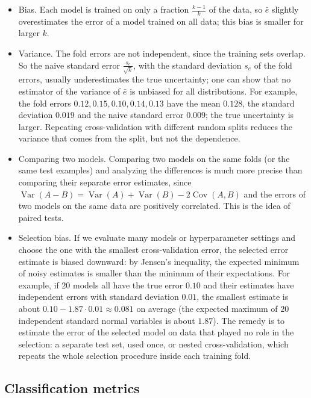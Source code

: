 \documentclass[11pt]{article}
\DeclareMathOperator{\Var}{Var}
\DeclareMathOperator{\Cov}{Cov}
\theoremstyle{definition}
\theoremstyle{plain}
\theoremstyle{remark}
\begin{document}
\begin{itemize}
    \item Bias. Each model is trained on only a fraction $\frac{k - 1}{k}$ of the data, so $\bar e$ slightly overestimates the error of a model trained on all data; this bias is smaller for larger $k$.
    \item Variance. The fold errors are not independent, since the training sets overlap. So the naive standard error $\frac{s_e}{\sqrt{k}}$, with the standard deviation $s_e$ of the fold errors, usually underestimates the true uncertainty; one can show that no estimator of the variance of $\bar e$ is unbiased for all distributions. For example, the fold errors $0.12, 0.15, 0.10, 0.14, 0.13$ have the mean $0.128$, the standard deviation $0.019$ and the naive standard error $0.009$; the true uncertainty is larger. Repeating cross-validation with different random splits reduces the variance that comes from the split, but not the dependence.
    \item Comparing two models. Comparing two models on the same folds (or the same test examples) and analyzing the differences is much more precise than comparing their separate error estimates, since $\Var(A - B) = \Var(A) + \Var(B) - 2\Cov(A, B)$ and the errors of two models on the same data are positively correlated. This is the idea of paired tests.
    \item Selection bias. If we evaluate many models or hyperparameter settings and choose the one with the smallest cross-validation error, the selected error estimate is biased downward: by Jensen's inequality, the expected minimum of noisy estimates is smaller than the minimum of their expectations. For example, if $20$ models all have the true error $0.10$ and their estimates have independent errors with standard deviation $0.01$, the smallest estimate is about $0.10 - 1.87 \cdot 0.01 \approx 0.081$ on average (the expected maximum of $20$ independent standard normal variables is about $1.87$). The remedy is to estimate the error of the selected model on data that played no role in the selection: a separate test set, used once, or nested cross-validation, which repeats the whole selection procedure inside each training fold.
\end{itemize}

\subsection{Classification metrics}\label{sec:classification-metrics}
\end{document}
